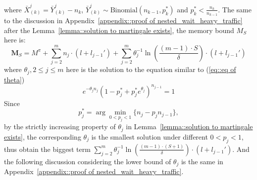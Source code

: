 where $\bar{X}_{(k)}^{j} = \bar{Y}_{(k)}^j - n_k$, $\bar{Y}_{(k)}^j \sim \text{Binomial}(n_{k-1}, p_k^*)$ and $p_k^*<\frac{n_k}{n_{k-1}}$. The same to the discussion in Appendix~\ref{appendix::proof of nested_wait_heavy_traffic} after the Lemma~\ref{lemma::solution to martingale exists}, the memory bound $M_S$ here is:
$$\mathbf{M}_S = M^{\pi} + \sum_{j=2}^m n_j \cdot (l + l_{j-1}') + \sum_{j=2}^m \theta_j^{-1}\ln\left( \frac{(m - 1) \cdot S}{\delta} \right) \cdot (l + l_{j-1}')$$
where $\theta_j, 2\leq j\leq m$ here is the solution to the equation similar to (\ref{eq::eq of theta})
\begin{equation}
e^{-\theta_j n_j} (1 - p_j^* + p_j^* e^{\theta_j})^{n_{j-1}} = 1\label{eq::eq of theta, time varying}
\end{equation}
Since 
$$p_j^* = \arg\min_{0< p_j< 1} \{n_j - p_j n_{j-1}\},$$
by the strictly increasing property of $\theta_j$ in Lemma~\ref{lemma::solution to martingale exists}, the corresponding $\theta_j$ is the smallest solution under different $0<p_j<1$, thus obtain the biggest term $\sum_{j=2}^m \theta_j^{-1}\ln\left( \frac{(m - 1) \cdot (S + 1)}{\delta} \right) \cdot (l + l_{j-1}')$. And the following discussion considering the lower bound of $\theta_j$ is the same in Appendix~\ref{appendix::proof of nested_wait_heavy_traffic}.

